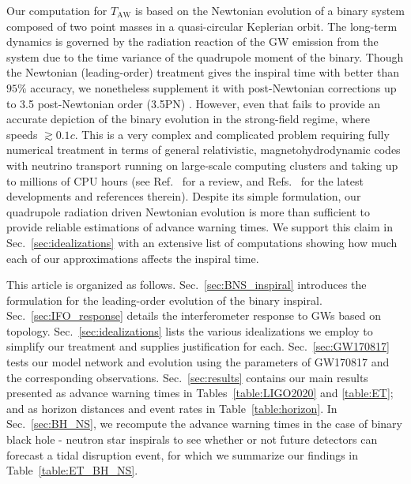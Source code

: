 \documentclass[prd,amsmath,amssymb,aps,floats,amsfonts,notitlepage,superscriptaddress,eqsecnum,nofootinbib,10pt]{revtex4-1}
\begin{document}
Our computation for $T_\text{AW}$ is based on the Newtonian evolution of a binary system composed of two point masses in a quasi-circular Keplerian orbit. 
The long-term dynamics is governed by the radiation reaction of 
the GW emission from the system due to the time variance of the quadrupole moment of the binary.
Though the Newtonian (leading-order) treatment gives the 
inspiral time with better than $ 95\%$ accuracy,
we nonetheless supplement it with post-Newtonian corrections up to 3.5 post-Newtonian order (3.5PN) \cite{Blanchet_LRR}.
However, even that fails to provide an accurate depiction of the binary
evolution in the strong-field regime, where speeds $\gtrsim 0.1c$. This is a very complex and complicated problem requiring fully
numerical treatment in terms of general relativistic, magnetohydrodynamic codes 
with neutrino transport running on large-scale computing clusters and taking up to millions of CPU hours 
(see Ref.~\cite{Shibata_book, Faber:2012rw} for a review, and Refs.~\cite{Baiotti:2016qnr,Kyutoku:2017voj, Zappa:2017xba, Dietrich:2018upm, Dietrich:2018phi} for the latest developments and references therein).
Despite its simple formulation, our quadrupole radiation driven Newtonian
evolution is more than sufficient to provide reliable estimations of advance warning times.
We support this claim in Sec.~\ref{sec:idealizations} with an extensive list of computations showing how much each of our approximations affects the inspiral time.

%
This article is organized as follows. Sec.~\ref{sec:BNS_inspiral} introduces the formulation for the leading-order evolution of the binary inspiral.
Sec.~\ref{sec:IFO_response} details the interferometer response to GWs based on topology.
Sec.~\ref{sec:idealizations} lists the various idealizations we employ to simplify our treatment and supplies justification for each.
Sec.~\ref{sec:GW170817} tests our model network and evolution using the parameters of GW170817 and the corresponding observations.
Sec.~\ref{sec:results} contains our main results presented as advance warning times in Tables~\ref{table:LIGO2020} and \ref{table:ET}; 
and as horizon distances and event rates in Table~\ref{table:horizon}.
In Sec.~\ref{sec:BH_NS}, we recompute the advance warning times in the case of binary black hole - neutron star inspirals to see whether or not 
future detectors can forecast a tidal disruption event, for which we summarize our findings in Table~\ref{table:ET_BH_NS}.
\end{document}
